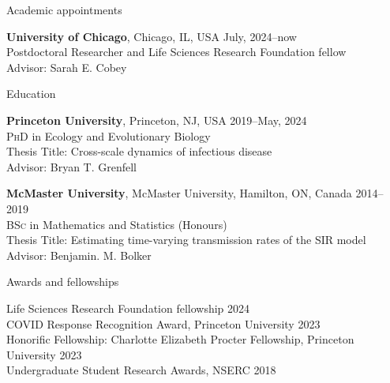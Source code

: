 \documentclass[
	11pt, %
]{resume} %
\begin{document}

\begin{rSection}{Academic appointments}

	\textbf{University of Chicago}, Chicago, IL, USA \hfill July, 2024--now \\ 
	Postdoctoral Researcher and Life Sciences Research Foundation fellow\\
	Advisor: Sarah E. Cobey
\end{rSection}


\begin{rSection}{Education}
	
	\textbf{Princeton University}, Princeton, NJ, USA \hfill 2019--May, 2024 \\ 
	\textsc{PhD} in Ecology and Evolutionary Biology\\
	Thesis Title: Cross-scale dynamics of infectious disease\\
	Advisor: Bryan T. Grenfell
	
	\textbf{McMaster University}, McMaster University, Hamilton, ON, Canada \hfill 2014--2019 \\ 
	\textsc{BSc} in Mathematics and Statistics (Honours)\\
	Thesis Title: Estimating time-varying transmission rates of the SIR model\\
	Advisor: Benjamin. M. Bolker
	
\end{rSection}


\begin{rSection}{Awards and fellowships}

Life Sciences Research Foundation fellowship \hfill 2024\\
COVID Response Recognition Award, Princeton University \hfill 2023\\
Honorific Fellowship: Charlotte Elizabeth Procter Fellowship, Princeton University  \hfill 2023\\
Undergraduate Student Research Awards, NSERC \hfill 2018

\end{rSection}
\end{document}
